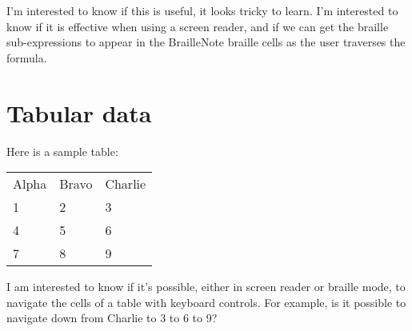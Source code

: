 \documentclass{article}
\begin{document}
I'm interested to know if this is useful, it looks tricky to learn.  I'm interested to know if it is effective when using a screen reader, and if we can get the braille sub-expressions to appear in the BrailleNote braille cells as the user traverses the formula.

\section{Tabular data}

Here is a sample table:

\begin{tabular}{lll}
Alpha & Bravo & Charlie \\
1 & 2 & 3 \\
4 & 5 & 6 \\
7 & 8 & 9 \\
\end{tabular}

I am interested to know if it's possible, either in screen reader or braille mode, to navigate the cells of a table with keyboard controls.  For example, is it possible to navigate down from Charlie to 3 to 6 to 9?
\end{document}
